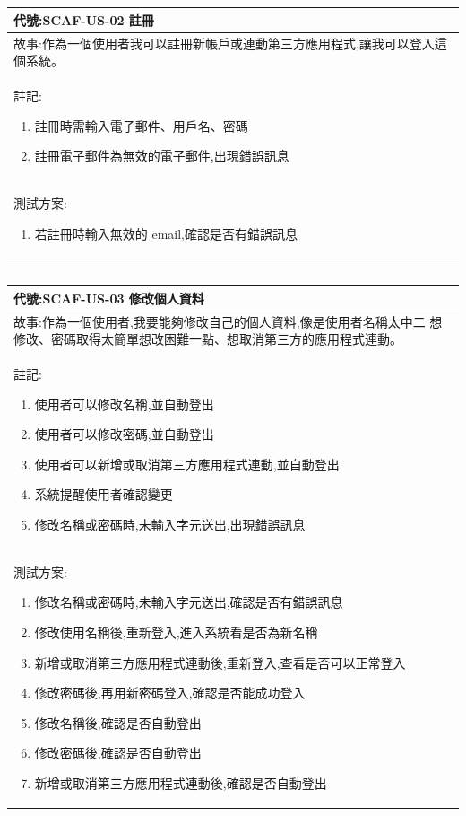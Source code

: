 \documentclass{report}
\begin{document}
\subsection*{}
\fontsize{12}{20}\selectfont
\begin{tabularx}{\textwidth}{|X|}
  \hline
  代號:SCAF-US-02 註冊 \\ \hline
  故事:作為一個使用者我可以註冊新帳戶或連動第三方應用程式,讓我可以登入這個系統。 \\ \hline
  註記:
  \begin{enumerate}
    \item 註冊時需輸入電子郵件、用戶名、密碼
    \item 註冊電子郵件為無效的電子郵件,出現錯誤訊息
  \end{enumerate} \\ \hline
  測試方案:
  \begin{enumerate}
    \item 若註冊時輸入無效的 email,確認是否有錯誤訊息
  \end{enumerate} \\ \hline
\end{tabularx}

\subsection*{}
\fontsize{12}{20}\selectfont
\begin{tabularx}{\textwidth}{|X|}
  \hline
  代號:SCAF-US-03 修改個人資料 \\
  \hline
  故事:作為一個使用者,我要能夠修改自己的個人資料,像是使用者名稱太中二
想修改、密碼取得太簡單想改困難一點、想取消第三方的應用程式連動。 \\
  \hline
  註記:
  \begin{enumerate}
    \item 使用者可以修改名稱,並自動登出
    \item 使用者可以修改密碼,並自動登出
    \item 使用者可以新增或取消第三方應用程式連動,並自動登出
    \item 系統提醒使用者確認變更
    \item 修改名稱或密碼時,未輸入字元送出,出現錯誤訊息
  \end{enumerate} \\
  \hline
  測試方案:
  \begin{enumerate}
    \item 修改名稱或密碼時,未輸入字元送出,確認是否有錯誤訊息
    \item 修改使用名稱後,重新登入,進入系統看是否為新名稱
    \item 新增或取消第三方應用程式連動後,重新登入,查看是否可以正常登入
    \item 修改密碼後,再用新密碼登入,確認是否能成功登入
    \item 修改名稱後,確認是否自動登出
    \item 修改密碼後,確認是否自動登出
    \item 新增或取消第三方應用程式連動後,確認是否自動登出
  \end{enumerate} \\
  \hline
\end{tabularx}
\end{document}
